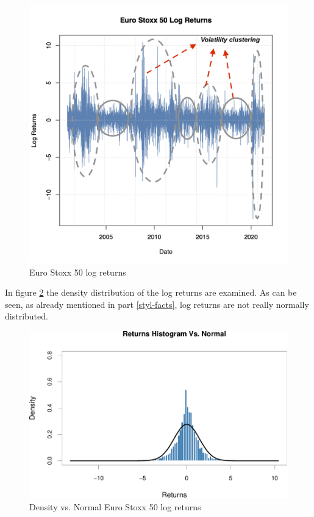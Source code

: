\documentclass[a4paper, nobind]{templates/ociamthesis}
\begin{document}
\begin{figure}[!ht]

{\centering \includegraphics[width=0.7\linewidth]{figures/vol-clustering-finalized-RI} 

}

\caption{Euro Stoxx 50 log returns}\label{fig:plot2}
\end{figure}

\noindent In figure \ref{fig:plot4} the density distribution of the log returns are examined. As can be seen, as already mentioned in part \ref{styl-facts}, log returns are not really normally distributed.~\\

\begin{figure}[!ht]

{\centering \includegraphics[width=0.75\linewidth]{_main_files/figure-latex/plot4-1} 

}

\caption{Density vs. Normal Euro Stoxx 50 log returns}\label{fig:plot4}
\end{figure}
\end{document}
